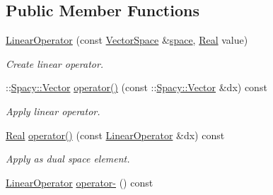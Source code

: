 \subsection*{\-Public \-Member \-Functions}
\begin{DoxyCompactItemize}
\item 
\hypertarget{structSpacy_1_1Scalar_1_1LinearOperator_af0bc3f5ddf91225b3add5e9e783f00d1}{\hyperlink{structSpacy_1_1Scalar_1_1LinearOperator_af0bc3f5ddf91225b3add5e9e783f00d1}{\-Linear\-Operator} (const \hyperlink{classSpacy_1_1VectorSpace}{\-Vector\-Space} \&\hyperlink{classSpacy_1_1VectorBase_aa999dbf9d679d895dfe04c10fbf9f5e9}{space}, \hyperlink{classSpacy_1_1Real}{\-Real} value)}\label{structSpacy_1_1Scalar_1_1LinearOperator_af0bc3f5ddf91225b3add5e9e783f00d1}

\begin{DoxyCompactList}\small\item\em \-Create linear operator. \end{DoxyCompactList}\item 
\hypertarget{structSpacy_1_1Scalar_1_1LinearOperator_aa978b12a9e892a6929487c8da259d4af}{\-::\hyperlink{classSpacy_1_1Vector}{\-Spacy\-::\-Vector} \hyperlink{structSpacy_1_1Scalar_1_1LinearOperator_aa978b12a9e892a6929487c8da259d4af}{operator()} (const \-::\hyperlink{classSpacy_1_1Vector}{\-Spacy\-::\-Vector} \&dx) const }\label{structSpacy_1_1Scalar_1_1LinearOperator_aa978b12a9e892a6929487c8da259d4af}

\begin{DoxyCompactList}\small\item\em \-Apply linear operator. \end{DoxyCompactList}\item 
\hypertarget{structSpacy_1_1Scalar_1_1LinearOperator_a18bb352947b03ea528a19089e4782320}{\hyperlink{classSpacy_1_1Real}{\-Real} \hyperlink{structSpacy_1_1Scalar_1_1LinearOperator_a18bb352947b03ea528a19089e4782320}{operator()} (const \hyperlink{structSpacy_1_1Scalar_1_1LinearOperator}{\-Linear\-Operator} \&dx) const }\label{structSpacy_1_1Scalar_1_1LinearOperator_a18bb352947b03ea528a19089e4782320}

\begin{DoxyCompactList}\small\item\em \-Apply as dual space element. \end{DoxyCompactList}\item 
\hypertarget{structSpacy_1_1Scalar_1_1LinearOperator_aba7eb546eca4983adcf2e39155af07d1}{\hyperlink{structSpacy_1_1Scalar_1_1LinearOperator}{\-Linear\-Operator} \hyperlink{structSpacy_1_1Scalar_1_1LinearOperator_aba7eb546eca4983adcf2e39155af07d1}{operator-\/} () const }\label{structSpacy_1_1Scalar_1_1LinearOperator_aba7eb546eca4983adcf2e39155af07d1}


\end{DoxyCompactItemize}
